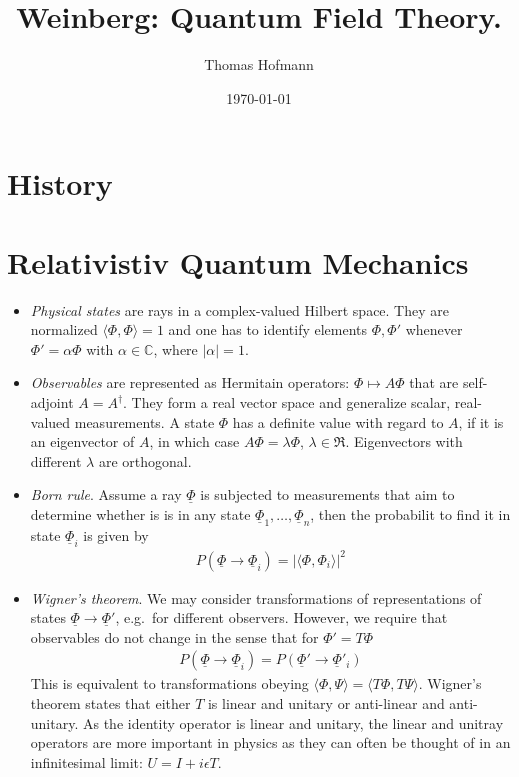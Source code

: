 \documentclass[12pt,a4paper]{article}
\author{Thomas Hofmann}
\title{Weinberg: Quantum Field Theory.}
\date{\today}
\newcommand{\rPhi}{{\underline{\Phi}}}
\begin{document}
\maketitle

\section{History}

\section{Relativistiv Quantum Mechanics}

\begin{itemize}
\item \textit{Physical states} are rays in a complex-valued Hilbert space. They are normalized $\langle \Phi, \Phi \rangle = 1$ and one has to identify elements $\Phi, \Phi'$ whenever $\Phi' = \alpha \Phi$ with $\alpha \in \mathbb  C$, where $|\alpha|=1$.
\item \textit{Observables} are represented as Hermitain operators: $\Phi \mapsto A \Phi$ that are self-adjoint $A = A^\dagger$. They form a real vector space and generalize scalar, real-valued measurements. A state $\Phi$ has a definite value with regard to $A$, if it is an eigenvector of $A$, in which case $A\Phi= \lambda \Phi$, $\lambda \in \Re$.   Eigenvectors with different $\lambda$ are orthogonal. 
\item  \textit{Born rule}. Assume a ray $\rPhi$ is subjected to measurements that aim to determine whether is is in any state $\rPhi_1,\dots,\rPhi_n$, then the probabilit to find it in state $\rPhi_i$ is given by 
\begin{align}
P(\rPhi \to \rPhi_i) =  |\langle \Phi, \Phi_i \rangle|^2 
\end{align}
\item \textit{Wigner's theorem}. We may consider transformations of representations of states $\rPhi \to \rPhi'$, e.g.~for different observers. However, we require that observables do not change in the sense that for $\Phi' = T \Phi$ 
\begin{align}
P(\rPhi \to \rPhi_i) = P(\rPhi' \to \rPhi'_i)
\end{align}
This is equivalent to transformations obeying $\langle \Phi, \Psi \rangle = \langle T \Phi, T \Psi \rangle$. Wigner's theorem states that either $T$ is linear and unitary or anti-linear and anti-unitary. As the identity operator is linear and unitary, the linear and unitray operators are more important in physics as they can often be thought of in an infinitesimal limit: $U = I + i \epsilon T$.  

\end{itemize}
\end{document}
